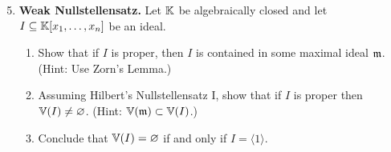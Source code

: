 \documentclass[12pt,reqno]{amsart}
\begin{document}
\begin{enumerate}[leftmargin=*]
\setcounter{enumi}{4}

\item\label{ex:weak-null} \textbf{Weak Nullstellensatz.} Let $\mathbb{K}$ be algebraically closed and let $I \subseteq \mathbb{K}[x_1,\ldots,x_n]$ be an ideal.
\begin{enumerate}[label=(\alph*),ref=\theenumi\alph*]
\item Show that if $I$ is proper, then $I$ is contained in some maximal ideal $\mathfrak{m}$. (Hint: Use Zorn's Lemma.) 
\item Assuming Hilbert's Nullstellensatz I, show that if  $I$ is proper then $\mathbb{V}(I) \neq \varnothing$. (Hint: $\mathbb{V}(\mathfrak{m}) \subset \mathbb{V}(I)$.)
\item Conclude that $\mathbb{V}(I) = \varnothing$ if and only if $I = \langle 1 \rangle$.
\end{enumerate}


\end{enumerate}
\end{document}
